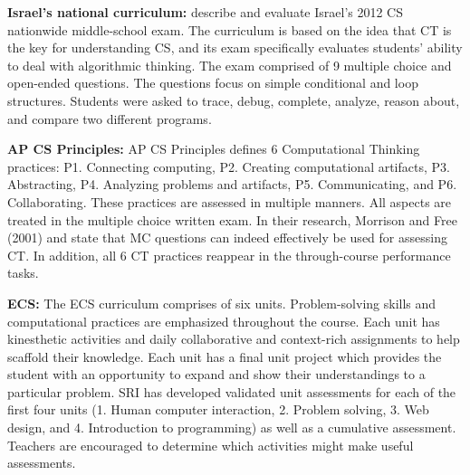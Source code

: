 \noindent\textbf{Israel's national curriculum:}
 describe and evaluate Israel's 2012 CS nationwide middle-school exam. The curriculum is based on the idea that CT is the key for understanding CS, and its exam specifically evaluates students' ability to deal with algorithmic thinking. The exam comprised of 9 multiple choice and open-ended questions. The questions focus on simple conditional and loop structures. Students were asked to trace, debug, complete, analyze, reason about, and compare two different programs.

\noindent\textbf{AP CS Principles:}
AP CS Principles defines 6 Computational Thinking practices: P1. Connecting computing, P2. Creating computational artifacts, P3. Abstracting, P4. Analyzing problems and artifacts, P5. Communicating, and P6. Collaborating. These practices are assessed in multiple manners. All aspects are treated in the multiple choice written exam. In their research, Morrison and Free (2001) and  state that MC questions can indeed effectively be used for assessing CT. In addition, all 6 CT practices reappear in the through-course performance tasks.

\noindent\textbf{ECS:}
The ECS  curriculum comprises of six units. Problem-solving skills and computational practices are emphasized throughout the course. Each unit has kinesthetic activities and daily collaborative and context-rich assignments to help scaffold their knowledge. Each unit has a final unit project which provides the student with an opportunity to expand and show their understandings to a particular problem. SRI has developed validated unit assessments for each of the first four units (1. Human computer interaction, 2. Problem solving, 3. Web design, and 4. Introduction to programming) as well as a cumulative assessment. Teachers are encouraged to determine which activities might make useful assessments.

%
%
%
%
%

